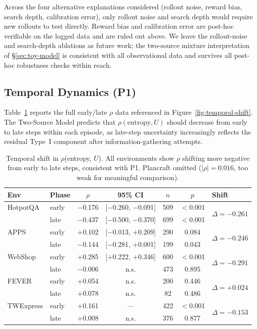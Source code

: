 Across the four alternative explanations considered (rollout
noise, reward bias, search depth, calibration error), only
rollout noise and search depth would require new rollouts to
test directly. Reward bias and calibration error are post-hoc
verifiable on the logged data and are ruled out above. We leave
the rollout-noise and search-depth ablations as future work; the
two-source mixture interpretation of \S\ref{sec:toy-model} is
consistent with all observational data and survives all
post-hoc robustness checks within reach.


\subsection{Temporal Dynamics (P1)}
\label{app:temporal}

Table~\ref{tab:temporal} reports the full early/late $\rho$ data
referenced in Figure~\ref{fig:temporal-shift}. The Two-Source Model
predicts that $\rho(\text{entropy}, U)$ should decrease from early
to late steps within each episode, as late-step uncertainty
increasingly reflects the residual Type~I component after
information-gathering attempts.

\begin{table}[h]
\centering
\caption{Temporal shift in $\rho$(entropy, $U$). All environments
show $\rho$ shifting more negative from early to late steps,
consistent with P1. Plancraft omitted ($|\rho|{=}0.016$, too weak
for meaningful comparison).}
\label{tab:temporal}
\begin{tabular}{llccccl}
\toprule
\textbf{Env} & \textbf{Phase} & $\rho$ & \textbf{95\% CI}
  & $n$ & $p$ & \textbf{Shift} \\
\midrule
HotpotQA & early & $-$0.176 & [$-$0.260, $-$0.091] & 509
  & $<$0.001
  & \multirow{2}{*}{$\Delta{=}{-}0.261$} \\
  & late  & $-$0.437 & [$-$0.500, $-$0.370] & 699
  & $<$0.001 & \\
\midrule
APPS & early & $+$0.102 & [$-$0.013, $+$0.209] & 290
  & 0.084
  & \multirow{2}{*}{$\Delta{=}{-}0.246$} \\
  & late  & $-$0.144 & [$-$0.281, $+$0.001] & 199
  & 0.043 & \\
\midrule
WebShop & early & $+$0.285 & [$+$0.222, $+$0.346] & 600
  & $<$0.001
  & \multirow{2}{*}{$\Delta{=}{-}0.291$} \\
  & late  & $-$0.006 & n.s. & 473 & 0.895 & \\
\midrule
FEVER & early & $+$0.054 & n.s. & 200 & 0.446
  & \multirow{2}{*}{$\Delta{=}{+}0.024$} \\
  & late  & $+$0.078 & n.s. & 82 & 0.486 & \\
\midrule
TWExpress & early & $+$0.161 & --- & 422 & $<$0.001
  & \multirow{2}{*}{$\Delta{=}{-}0.153$} \\
  & late  & $+$0.008 & n.s. & 376 & 0.877 & \\
\bottomrule
\end{tabular}
\end{table}

